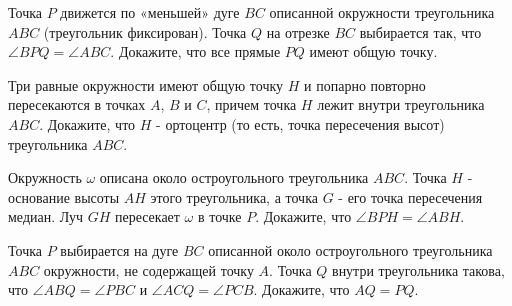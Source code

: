 \newpage

\hspace{3mm}

 Точка $P$ движется по «меньшей» дуге $B C$ описанной окружности треугольника $A B C$ (треугольник фиксирован). Точка $Q$ на отрезке $B C$ выбирается так, что $\angle B P Q=\angle A B C$. Докажите, что все прямые $P Q$ имеют общую точку.

 Три равные окружности имеют общую точку $H$ и попарно повторно пересекаются в точках $A$, $B$ и $C$, причем точка $H$ лежит внутри треугольника $A B C$. Докажите, что $H$ - ортоцентр (то есть, точка пересечения высот) треугольника $A B C$.

Окружность $\omega$ описана около остроугольного треугольника $A B C$. Точка $H$ - основание высоты $A H$ этого треугольника, а точка $G$ - его точка пересечения медиан. Луч $G H$ пересекает $\omega$ в точке $P$. Докажите, что $\angle B P H=\angle A B H$.

Точка $P$ выбирается на дуге $B C$ описанной около остроугольного треугольника $A B C$ окружности, не содержащей точку $A$. Точка $Q$ внутри треугольника такова, что $\angle A B Q=\angle P B C$ и $\angle A C Q=\angle P C B$. Докажите, что $A Q=P Q$.